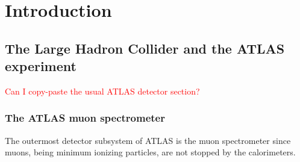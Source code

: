 
\chapter{Introduction}
\label{chap:intro}


\section{The Large Hadron Collider and the ATLAS experiment}
\textcolor{red}{Can I copy-paste the usual ATLAS detector section?}

\subsection{The ATLAS muon spectrometer}
The outermost detector subsystem of ATLAS is the muon spectrometer since muons, being minimum ionizing particles, are not stopped by the calorimeters.